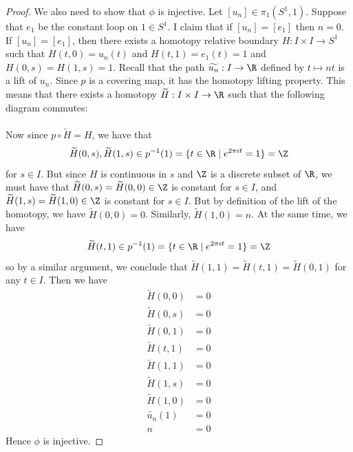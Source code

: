 \documentclass[a4paper]{article}
\begin{document}
\begin{thm}{}{}
\begin{proof}
We also need to show that $\phi$ is injective. Let $[u_n]\in\pi_1(S^1,1)$. Suppose that $e_1$ be the constant loop on $1\in S^1$. I claim that if $[u_n]=[e_1]$ then $n=0$. If $[u_n]=[e_1]$, then there exists a homotopy relative boundary $H:I\times I\to S^1$ such that $H(t,0)=u_n(t)$ and $H(t,1)=e_1(t)=1$ and $H(0,s)=H(1,s)=1$. Recall that the path $\widetilde{u_n}:I\to\R$ defined by $t\mapsto nt$ is a lift of $u_n$. Since $p$ is a covering map, it has the homotopy lifting property. This means that there exists a homotopy $\widetilde{H}:I\times I\to\R$ such that the following diagram commutes: \\
 \\
Now since $p\circ\widetilde{H}=H$, we have that $$\widetilde{H}(0,s),\widetilde{H}(1,s)\in p^{-1}(1)=\{t\in\R\;|\;e^{2\pi it}=1\}=\Z$$ for $s\in I$. But since $H$ is continuous in $s$ and $\Z$ is a discrete subset of $\R$, we must have that $\widetilde{H}(0,s)=\widetilde{H}(0,0)\in\Z$ is constant for $s\in I$, and $\widetilde{H}(1,s)=\widetilde{H}(1,0)\in\Z$ is constant for $s\in I$. But by definition of the lift of the homotopy, we have $\widetilde{H}(0,0)=0$. Similarly, $\widetilde{H}(1,0)=n$. At the same time, we have $$\widetilde{H}(t,1)\in p^{-1}(1)=\{t\in\R\;|\;e^{2\pi it}=1\}=\Z$$ so by a similar argument, we conclude that $\widetilde{H}(1,1)=\widetilde{H}(t,1)=\widetilde{H}(0,1)$ for any $t\in I$. Then we have 
\begin{align*}
\widetilde{H}(0,0)&=0\\
\widetilde{H}(0,s)&=0\tag{for any $s\in I$}\\
\widetilde{H}(0,1)&=0\\
\widetilde{H}(t,1)&=0\tag{for any $t\in I$}\\
\widetilde{H}(1,1)&=0\\
\widetilde{H}(1,s)&=0\tag{for any $s\in I$}\\
\widetilde{H}(1,0)&=0\\
\widetilde{u_n}(1)&=0\\
n&=0
\end{align*}
Hence $\phi$ is injective. 
\end{proof}
\end{thm}
\end{document}
